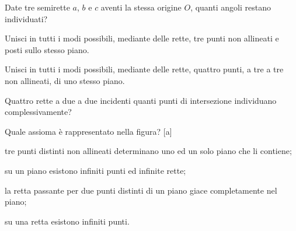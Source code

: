 \begin{esercizio}
\label{ese:1.37}
Date tre semirette $a$, $b$ e $c$ aventi la stessa origine $O$, 
quanti angoli restano individuati?
\end{esercizio}

\begin{esercizio}
\label{ese:1.38}
Unisci in tutti i modi possibili, mediante delle rette, tre punti non 
allineati e posti sullo stesso piano.
\end{esercizio}

\begin{esercizio}
\label{ese:1.39}
Unisci in tutti i modi possibili, mediante delle rette, quattro 
punti, a tre a tre non allineati, di uno stesso piano.
\end{esercizio}

\begin{esercizio}
\label{ese:1.40}
Quattro rette a due a due incidenti quanti punti di intersezione 
individuano complessivamente?
\end{esercizio}

\begin{esercizio}
\label{ese:1.41}
Quale assioma è rappresentato nella figura?
\hfill[a]

\begin{minipage}{.59 \textwidth}
\begin{enumeratea}
\item tre punti distinti non allineati determinano uno ed un solo 
piano che li contiene;
\item su un piano esistono infiniti punti ed infinite rette;
\item la retta passante per due punti distinti di un piano giace 
completamente nel piano;
\item su una retta esistono infiniti punti.
\end{enumeratea}
\end{minipage}
\hfil
\begin{minipage}{.39 \textwidth}
\begin{inaccessibleblock}
\centering
\end{inaccessibleblock}
\end{minipage}
\end{esercizio}



